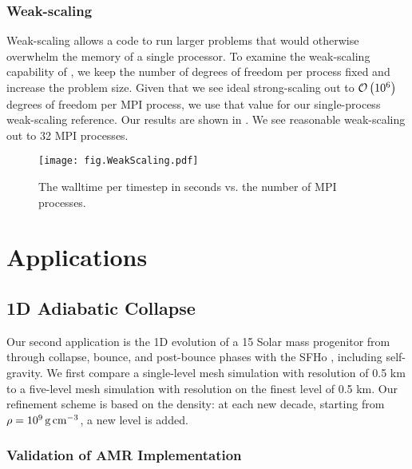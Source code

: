\subsubsection{Weak-scaling}

Weak-scaling allows a code to run larger problems that would otherwise
overwhelm the memory of a single processor.
To examine the weak-scaling capability of \thornado, we keep the number
of degrees of freedom per process fixed and increase the problem
size.
Given that we see ideal strong-scaling out to $\mathcal{O}\left(10^{6}\right)$
degrees of freedom per MPI process, we use that value for our single-process
weak-scaling reference.
Our results are shown in .
We see reasonable weak-scaling out to 32 MPI processes.
\begin{figure}[htb!]
  \centering
  \texttt{[image: fig.WeakScaling.pdf]}
  \caption{The walltime per timestep in seconds vs.
the number of MPI processes.}
  \label{fig.WS}
\end{figure}

\section{Applications}

\subsection{1D Adiabatic Collapse}

Our second application is the 1D evolution of a 15 Solar mass progenitor
from \citet{wh2007} through collapse, bounce, and post-bounce phases with the
SFHo \eos, including self-gravity.
We first compare a single-level mesh simulation with resolution of 0.5 km
to a five-level mesh simulation with resolution on the finest level of 0.5 km.
Our refinement scheme is based on the density: at each new decade, starting
from $\rho=10^{9}\,\mathrm{g}\,\mathrm{cm}^{-3}$, a new level is added.

\subsubsection{Validation of AMR Implementation}

